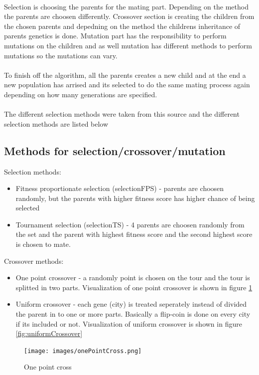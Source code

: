 \documentclass[12pt]{report}
\begin{document}
    \\
    Selection is choosing the parents for the mating part. Depending on the method the parents are choosen differently. Crossover section is creating the children from the chosen parents and depedning on the method the childrens inheritance of parents genetics is done. Mutation part has the responsibility to perform mutations on the children and as well mutation has different methods to perform mutations so the mutations can vary.\\
    \\
    To finish off the algorithm, all the parents creates a new child and at the end a new population has arrised and its selected to do the same mating process again depending on how many generations are specified.\\
    \\
    The different selection methods were taken from this source \cite{Elitismsource} and the different selection methods are listed below 
    \subsection{Methods for selection/crossover/mutation}
    Selection methods: \cite{Elitismsource}
    \begin{itemize}
        \item Fitness proportionate selection (selectionFPS) - parents are choosen randomly, but the parents with higher fitness score has higher chance of being selected
        \item Tournament selection (selectionTS) - 4 parents are choosen randomly from the set and the parent with highest fitness score and the second highest score is chosen to mate.
    \end{itemize}
    Crossover methods: \cite{CrossoverSource} 
    \begin{itemize}
        \item One point crossover - a randomly point is chosen on the tour and the tour is splitted in two parts. Visualization of one point crossover is shown in figure \ref{fig:OnePointCross}
        \item Uniform crossover - each gene (city) is treated seperately instead of divided the parent in to one or more parts. Basically a flip-coin is done on every city if its included or not. Visualization of uniform crossover is shown in figure \ref{fig:uniformCrossover}
    \end{itemize}
    
    \begin{figure}
        \centering
        \texttt{[image: images/onePointCross.png]}
        \caption{One point cross}
        \label{fig:OnePointCross}
    \end{figure}
\end{document}
